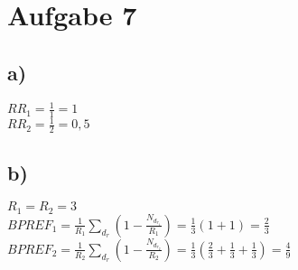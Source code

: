 \section*{Aufgabe 7}
\subsection*{a)}
$RR_{1} = \frac{1}{1} = 1$\\
$RR_{2} = \frac{1}{2} = 0,5$\\

\subsection*{b)}

$R_{1} = R_{2} = 3$\\
$BPREF_{1} = \frac{1}{R_{1}} \sum_{d_{r}}(1 - \frac{N_{d_{r_{1}}}}{R_{1}}) = \frac{1}{3} (1 + 1) = \frac{2}{3}$\\
$BPREF_{2} = \frac{1}{R_{2}} \sum_{d_{r}}(1 - \frac{N_{d_{r_{2}}}}{R_{2}}) =  \frac{1}{3} (\frac{2}{3} + \frac{1}{3} + \frac{1}{3}) = \frac{4}{9}$